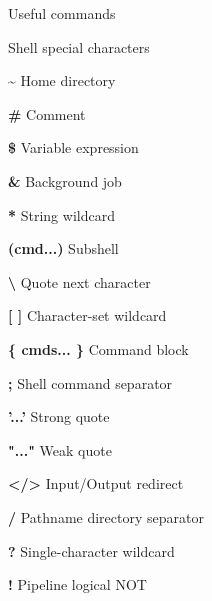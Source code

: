 \documentclass[10pt,a4paper]{article}
\begin{document}
\begin{multicols}{3}
\begin{textbox}{Useful commands}
\end{textbox}



\begin{textbox}{Shell special characters}

\begin{multicols}{2}

\textbf{\textasciitilde}	Home directory	

\textbf{\#}	Comment

\textbf{\$}	Variable expression

\textbf{\&}	Background job	

\textbf{*}	String wildcard	

\textbf{(cmd...)}	Subshell

\textbf{\textbackslash}	Quote next character

\textbf{[ ]}    Character-set wildcard

\textbf{ \{ cmds... \} }	Command block

\textbf{;}	Shell command separator

\textbf{'...'}	Strong quote

\textbf{"..."}	Weak quote

\textbf{</>}	Input/Output redirect

\textbf{/}	Pathname directory separator

\textbf{?}	Single-character wildcard

\textbf{!}	Pipeline logical NOT

\end{multicols}

\end{textbox}











\end{multicols}
\end{document}

